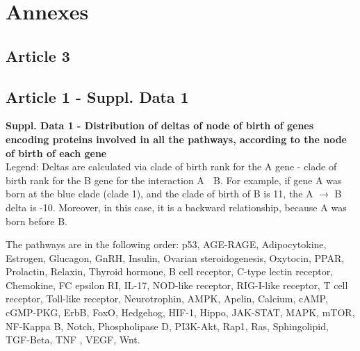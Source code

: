 \chapter{Annexes}
\thispagestyle{firstpage}

\minitoc
\newpage

\section{Article 3}\label{article3}


\section{Article 1 - Suppl. Data 1}
\textbf{Suppl. Data 1 - Distribution of deltas of node of birth of genes encoding proteins involved in all the pathways, according to the node of birth of each gene}\\
Legend: Deltas are calculated via clade of birth rank for the A gene - clade of birth rank for the B gene for the interaction A  B. For example, if gene A was born at the blue clade (clade 1), and the clade of birth of B is 11, the A $\rightarrow$ B delta is -10. Moreover, in this case, it is a backward relationship, because A was born before B. 
\par The pathways are in the following order: 
p53, AGE-RAGE, Adipocytokine, Estrogen, Glucagon, GnRH, Insulin, Ovarian steroidogenesis, Oxytocin, PPAR, Prolactin, Relaxin, Thyroid hormone, B cell receptor, C-type lectin receptor, Chemokine, FC epsilon RI, IL-17, NOD-like receptor, RIG-I-like receptor, T cell receptor, Toll-like receptor, Neurotrophin, AMPK, Apelin, Calcium, cAMP, cGMP-PKG, ErbB, FoxO, Hedgehog, HIF-1, Hippo, JAK-STAT,  MAPK, mTOR, NF-Kappa B, Notch, Phospholipase D, PI3K-Akt, Rap1, Ras, Sphingolipid, TGF-Beta, TNF , VEGF, Wnt. 



